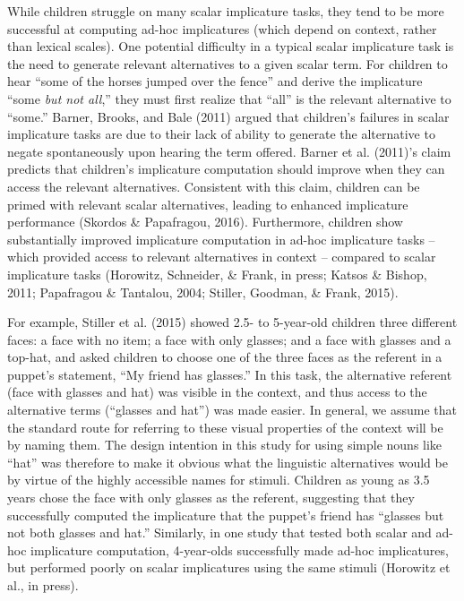 \documentclass[man]{apa6}
\theoremstyle{definition}
\theoremstyle{definition}
\theoremstyle{definition}
\theoremstyle{remark}
\begin{document}
While children struggle on many scalar implicature tasks, they tend to
be more successful at computing ad-hoc implicatures (which depend on
context, rather than lexical scales). One potential difficulty in a
typical scalar implicature task is the need to generate relevant
alternatives to a given scalar term. For children to hear \enquote{some
of the horses jumped over the fence} and derive the implicature
\enquote{some \emph{but not all},} they must first realize that
\enquote{all} is the relevant alternative to \enquote{some.} Barner,
Brooks, and Bale (2011) argued that children's failures in scalar
implicature tasks are due to their lack of ability to generate the
alternative to negate spontaneously upon hearing the term offered.
Barner et al. (2011)'s claim predicts that children's implicature
computation should improve when they can access the relevant
alternatives. Consistent with this claim, children can be primed with
relevant scalar alternatives, leading to enhanced implicature
performance (Skordos \& Papafragou, 2016). Furthermore, children show
substantially improved implicature computation in ad-hoc implicature
tasks -- which provided access to relevant alternatives in context --
compared to scalar implicature tasks (Horowitz, Schneider, \& Frank, in
press; Katsos \& Bishop, 2011; Papafragou \& Tantalou, 2004; Stiller,
Goodman, \& Frank, 2015).

For example, Stiller et al. (2015) showed 2.5- to 5-year-old children
three different faces: a face with no item; a face with only glasses;
and a face with glasses and a top-hat, and asked children to choose one
of the three faces as the referent in a puppet's statement, \enquote{My
friend has glasses.} In this task, the alternative referent (face with
glasses and hat) was visible in the context, and thus access to the
alternative terms (\enquote{glasses and hat}) was made easier. In
general, we assume that the standard route for referring to these visual
properties of the context will be by naming them. The design intention
in this study for using simple nouns like \enquote{hat} was therefore to
make it obvious what the linguistic alternatives would be by virtue of
the highly accessible names for stimuli. Children as young as 3.5 years
chose the face with only glasses as the referent, suggesting that they
successfully computed the implicature that the puppet's friend has
\enquote{glasses but not both glasses and hat.} Similarly, in one study
that tested both scalar and ad-hoc implicature computation, 4-year-olds
successfully made ad-hoc implicatures, but performed poorly on scalar
implicatures using the same stimuli (Horowitz et al., in press).
\end{document}
